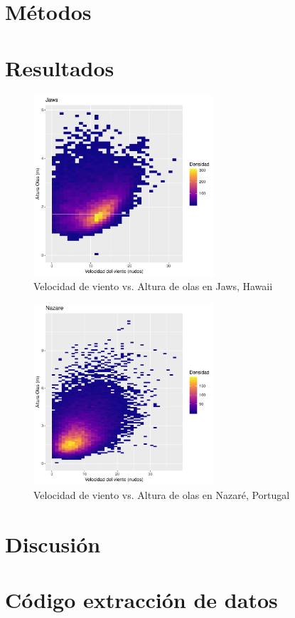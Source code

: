 \section{Métodos}%
\label{sec:metodos}

\section{Resultados}%
\label{sec:resultados}



\begin{figure}[!ht]
\label{fig:wind_waves_jaws}
  \caption{Velocidad de viento vs. Altura de olas en Jaws, Hawaii}
\centering
\includegraphics[width=0.6\textwidth]{./figures/jaws.pdf}
\end{figure}

\begin{figure}[!ht]
\label{fig:wind_waves_nazare}
  \caption{Velocidad de viento vs. Altura de olas en Nazaré, Portugal}
\centering
\includegraphics[width=0.6\textwidth]{./figures/nazare.pdf}
\end{figure}



\section{Discusión}%
\label{sec:discusión}


\pagebreak
\appendix

\section{Código extracción de datos}%
\label{sec:codigo_extraccion_de_datos}





